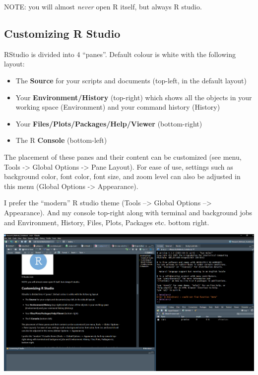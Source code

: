 \documentclass[
]{html}
\theoremstyle{definition}
\theoremstyle{definition}
\theoremstyle{definition}
\theoremstyle{definition}
\theoremstyle{remark}
\begin{document}
NOTE: you will almost \emph{never} open R itself, but always R studio.

\hypertarget{customizing-r-studio}{%
\subsection{Customizing R Studio}\label{customizing-r-studio}}

RStudio is divided into 4 ``panes''. Default colour is white with the following layout:

\begin{itemize}
\item
  The \textbf{Source} for your scripts and documents (top-left, in the default layout)
\item
  Your \textbf{Environment/History} (top-right) which shows all the objects in your working space (Environment) and your command history (History)
\item
  Your \textbf{Files/Plots/Packages/Help/Viewer} (bottom-right)
\item
  The R \textbf{Console} (bottom-left)
\end{itemize}

The placement of these panes and their content can be customized (see menu, Tools -\textgreater{} Global Options -\textgreater{} Pane Layout). For ease of use, settings such as background color, font color, font size, and zoom level can also be adjusted in this menu (Global Options -\textgreater{} Appearance).

I prefer the ``modern'' R studio theme (Tools --\textgreater{} Global Options --\textgreater{} Appearance). And my console top-right along with terminal and background jobs and Environment, History, Files, Plots, Packages etc. bottom right.

\includegraphics{images/clipboard-3227369920.png}
\end{document}
